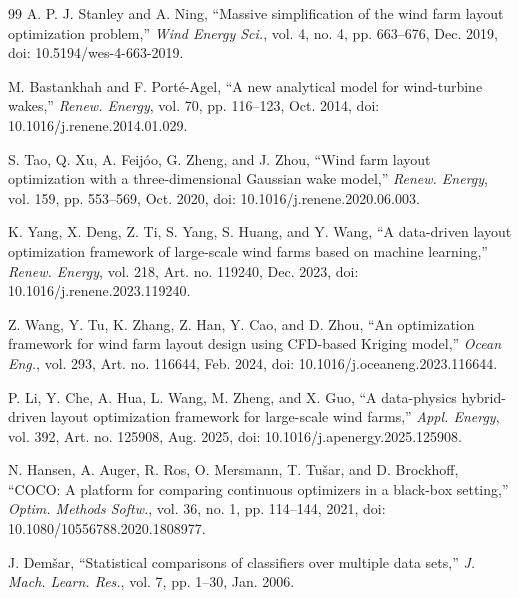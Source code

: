{\begin{thebibliography}{99}
A. P. J. Stanley and A. Ning, ``Massive simplification of the wind farm layout optimization problem,'' \textit{Wind Energy Sci.}, vol. 4, no. 4, pp. 663--676, Dec. 2019, doi: 10.5194/wes-4-663-2019.

M. Bastankhah and F. Port\'e-Agel, ``A new analytical model for wind-turbine wakes,'' \textit{Renew. Energy}, vol. 70, pp. 116--123, Oct. 2014, doi: 10.1016/j.renene.2014.01.029.

S. Tao, Q. Xu, A. Feij\'oo, G. Zheng, and J. Zhou, ``Wind farm layout optimization with a three-dimensional Gaussian wake model,'' \textit{Renew. Energy}, vol. 159, pp. 553--569, Oct. 2020, doi: 10.1016/j.renene.2020.06.003.

K. Yang, X. Deng, Z. Ti, S. Yang, S. Huang, and Y. Wang, ``A data-driven layout optimization framework of large-scale wind farms based on machine learning,'' \textit{Renew. Energy}, vol. 218, Art. no. 119240, Dec. 2023, doi: 10.1016/j.renene.2023.119240.

Z. Wang, Y. Tu, K. Zhang, Z. Han, Y. Cao, and D. Zhou, ``An optimization framework for wind farm layout design using CFD-based Kriging model,'' \textit{Ocean Eng.}, vol. 293, Art. no. 116644, Feb. 2024, doi: 10.1016/j.oceaneng.2023.116644.

P. Li, Y. Che, A. Hua, L. Wang, M. Zheng, and X. Guo, ``A data-physics hybrid-driven layout optimization framework for large-scale wind farms,'' \textit{Appl. Energy}, vol. 392, Art. no. 125908, Aug. 2025, doi: 10.1016/j.apenergy.2025.125908.

N. Hansen, A. Auger, R. Ros, O. Mersmann, T. Tu\v{s}ar, and D. Brockhoff, ``COCO: A platform for comparing continuous optimizers in a black-box setting,'' \textit{Optim. Methods Softw.}, vol. 36, no. 1, pp. 114--144, 2021, doi: 10.1080/10556788.2020.1808977.

J. Dem\v{s}ar, ``Statistical comparisons of classifiers over multiple data sets,'' \textit{J. Mach. Learn. Res.}, vol. 7, pp. 1--30, Jan. 2006.


\end{thebibliography}}
